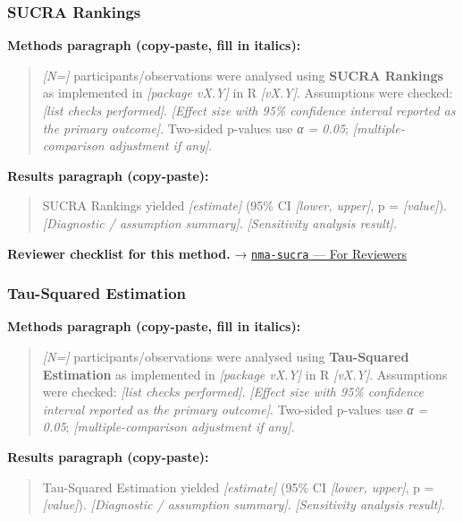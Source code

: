 \documentclass[
]{article}
\begin{document}
\subsubsection{SUCRA Rankings}\label{sucra-rankings}

\textbf{Methods paragraph (copy-paste, fill in italics):}

\begin{quote}
\emph{{[}N={]}} participants/observations were analysed using
\textbf{SUCRA Rankings} as implemented in \emph{{[}package vX.Y{]}} in R
\emph{{[}vX.Y{]}}. Assumptions were checked: \emph{{[}list checks
performed{]}}. \emph{{[}Effect size with 95\% confidence interval
reported as the primary outcome{]}}. Two-sided p-values use \emph{α =
0.05}; \emph{{[}multiple-comparison adjustment if any{]}}.
\end{quote}

\textbf{Results paragraph (copy-paste):}

\begin{quote}
SUCRA Rankings yielded \emph{{[}estimate{]}} (95\% CI \emph{{[}lower,
upper{]}}, p = \emph{{[}value{]}}). \emph{{[}Diagnostic / assumption
summary{]}}. \emph{{[}Sensitivity analysis result{]}}.
\end{quote}

\textbf{Reviewer checklist for this method.} →
\href{../chapters/15-metaanalysis/nma-sucra.Rmd\#for-reviewers}{\texttt{nma-sucra}
--- For Reviewers}

\subsubsection{Tau-Squared Estimation}\label{tau-squared-estimation}

\textbf{Methods paragraph (copy-paste, fill in italics):}

\begin{quote}
\emph{{[}N={]}} participants/observations were analysed using
\textbf{Tau-Squared Estimation} as implemented in \emph{{[}package
vX.Y{]}} in R \emph{{[}vX.Y{]}}. Assumptions were checked: \emph{{[}list
checks performed{]}}. \emph{{[}Effect size with 95\% confidence interval
reported as the primary outcome{]}}. Two-sided p-values use \emph{α =
0.05}; \emph{{[}multiple-comparison adjustment if any{]}}.
\end{quote}

\textbf{Results paragraph (copy-paste):}

\begin{quote}
Tau-Squared Estimation yielded \emph{{[}estimate{]}} (95\% CI
\emph{{[}lower, upper{]}}, p = \emph{{[}value{]}}). \emph{{[}Diagnostic
/ assumption summary{]}}. \emph{{[}Sensitivity analysis result{]}}.
\end{quote}
\end{document}

